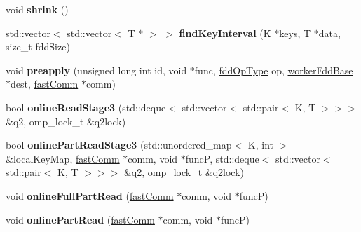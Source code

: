 \begin{DoxyCompactItemize}
\hypertarget{classfaster_1_1workerIFddCore_a28293a19e96e13b46cbdbe58ece0df45}{}\label{classfaster_1_1workerIFddCore_a28293a19e96e13b46cbdbe58ece0df45} 
void {\bfseries shrink} ()
\item 
\hypertarget{classfaster_1_1workerIFddCore_aee93cac3630c6ce558803a9839ed913b}{}\label{classfaster_1_1workerIFddCore_aee93cac3630c6ce558803a9839ed913b} 
std\+::vector$<$ std\+::vector$<$ T $\ast$ $>$ $>$ {\bfseries find\+Key\+Interval} (K $\ast$keys, T $\ast$data, size\+\_\+t fdd\+Size)
\item 
\hypertarget{classfaster_1_1workerIFddCore_a9a20510374fc95015a5c95301a3d7ee7}{}\label{classfaster_1_1workerIFddCore_a9a20510374fc95015a5c95301a3d7ee7} 
void {\bfseries preapply} (unsigned long int id, void $\ast$func, \hyperlink{namespacefaster_a64379512d12d41c6e58f176939abfd80}{fdd\+Op\+Type} op, \hyperlink{classfaster_1_1workerFddBase}{worker\+Fdd\+Base} $\ast$dest, \hyperlink{classfaster_1_1fastComm}{fast\+Comm} $\ast$comm)
\item 
\hypertarget{classfaster_1_1workerIFddCore_adc15bc0b335d424ce2f2f63be322c4e8}{}\label{classfaster_1_1workerIFddCore_adc15bc0b335d424ce2f2f63be322c4e8} 
bool {\bfseries online\+Read\+Stage3} (std\+::deque$<$ std\+::vector$<$ std\+::pair$<$ K, T $>$$>$$>$ \&q2, omp\+\_\+lock\+\_\+t \&q2lock)
\item 
\hypertarget{classfaster_1_1workerIFddCore_afcda8f81df96e8b644514728376a2c8c}{}\label{classfaster_1_1workerIFddCore_afcda8f81df96e8b644514728376a2c8c} 
bool {\bfseries online\+Part\+Read\+Stage3} (std\+::unordered\+\_\+map$<$ K, int $>$ \&local\+Key\+Map, \hyperlink{classfaster_1_1fastComm}{fast\+Comm} $\ast$comm, void $\ast$funcP, std\+::deque$<$ std\+::vector$<$ std\+::pair$<$ K, T $>$$>$$>$ \&q2, omp\+\_\+lock\+\_\+t \&q2lock)
\item 
\hypertarget{classfaster_1_1workerIFddCore_a828e4018971a65507efbda297044b4c4}{}\label{classfaster_1_1workerIFddCore_a828e4018971a65507efbda297044b4c4} 
void {\bfseries online\+Full\+Part\+Read} (\hyperlink{classfaster_1_1fastComm}{fast\+Comm} $\ast$comm, void $\ast$funcP)
\item 
\hypertarget{classfaster_1_1workerIFddCore_a9c1d57361e89d705933813b757c7b8a6}{}\label{classfaster_1_1workerIFddCore_a9c1d57361e89d705933813b757c7b8a6} 
void {\bfseries online\+Part\+Read} (\hyperlink{classfaster_1_1fastComm}{fast\+Comm} $\ast$comm, void $\ast$funcP)
\item 
\hypertarget{classfaster_1_1workerIFddCore_a13461388a9630c109c776c212570f97d}{}\label{classfaster_1_1workerIFddCore_a13461388a9630c109c776c212570f97d} 

\end{DoxyCompactItemize}
